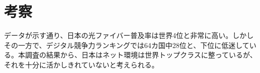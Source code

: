 \documentclass[a4paper,11pt,dvipdfmx]{ujarticle}
\begin{document}
\section{考察}

データが示す通り、日本の光ファイバー普及率は世界4位と非常に高い。しかしその一方で、デジタル競争力ランキングでは64カ国中28位と、下位に低迷している。本調査の結果から、日本はネット環境は世界トップクラスに整っているが、それを十分に活かしきれていないと考えられる。







%

%


\end{document}
